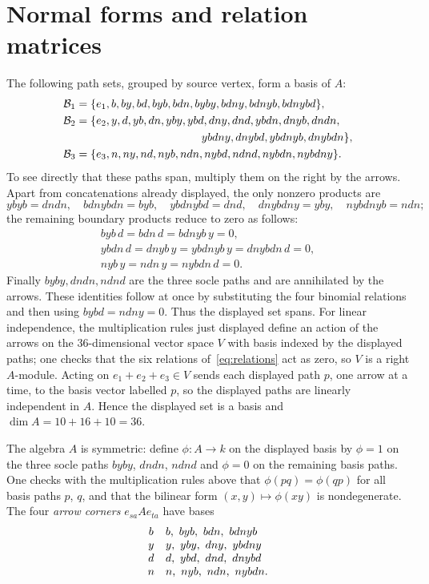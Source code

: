 \documentclass[11pt]{amsart}
\theoremstyle{plain}
\theoremstyle{definition}
\begin{document}
\appendix

\section{Normal forms and relation matrices}\label{app:normal}

The following path sets, grouped by source vertex, form a basis of $A$:
\[
\begin{aligned}
\mathcal B_1={}&\{e_1,b,by,bd,byb,bdn,byby,bdny,bdnyb,bdnybd\},\\
\mathcal B_2={}&\{e_2,y,d,yb,dn,yby,ybd,dny,dnd,ybdn,dnyb,dndn,\\
 &\hspace{35mm}ybdny,dnybd,ybdnyb,dnybdn\},\\
\mathcal B_3={}&\{e_3,n,ny,nd,nyb,ndn,nybd,ndnd,nybdn,nybdny\}.
\end{aligned}
\]
To see directly that these paths span, multiply them on the right by the arrows. Apart from concatenations
already displayed, the only nonzero products are
\[
 ybyb=dndn,\quad bdnybdn=byb,\quad ybdnybd=dnd,\quad
 dnybdny=yby,\quad nybdnyb=ndn;
\]
the remaining boundary products reduce to zero as follows:
\[
\begin{gathered}
 byb\,d=bdn\,d=bdnyb\,y=0,\\
 ybdn\,d=dnyb\,y=ybdnyb\,y=dnybdn\,d=0,\\
 nyb\,y=ndn\,y=nybdn\,d=0.
\end{gathered}
\]
Finally $byby,dndn,ndnd$ are the three socle paths and are annihilated by the arrows. These identities follow
at once by substituting the four binomial relations and then using $bybd=ndny=0$. Thus the displayed set
spans. For linear independence, the multiplication rules just displayed define an action of the arrows on the
$36$-dimensional vector space $V$ with basis indexed by the displayed paths; one checks that the six relations
of~\eqref{eq:relations} act as zero, so $V$ is a right $A$-module. Acting on $e_1+e_2+e_3\in V$ sends each
displayed path $p$, one arrow at a time, to the basis vector labelled $p$, so the displayed paths are linearly
independent in $A$. Hence the displayed set is a basis and $\dim A=10+16+10=36$.

The algebra $A$ is symmetric: define $\phi\colon A\to k$ on the displayed basis by $\phi=1$ on the three socle
paths $byby$, $dndn$, $ndnd$ and $\phi=0$ on the remaining basis paths. One checks with the multiplication
rules above that $\phi(pq)=\phi(qp)$ for all basis paths $p$, $q$, and that the bilinear form
$(x,y)\mapsto\phi(xy)$ is nondegenerate. The four \emph{arrow corners} $e_{sa}Ae_{ta}$ have bases
\[
\begin{array}{c@{\quad}l}
b & b,\ byb,\ bdn,\ bdnyb\\
y & y,\ yby,\ dny,\ ybdny\\
d & d,\ ybd,\ dnd,\ dnybd\\
n & n,\ nyb,\ ndn,\ nybdn.
\end{array}
\]
\end{document}
